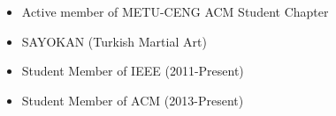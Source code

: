 \documentclass[margin, 10pt]{res} %
\begin{document}
\begin{resume}
        \begin{itemize}
            \itemsep -2pt %
            \item Active member of METU-CENG ACM Student Chapter
            \item SAYOKAN (Turkish Martial Art)
            \item Student Member of IEEE (2011-Present)
            \item Student Member of ACM (2013-Present)
        \end{itemize}































    \end{resume}
\end{document}
